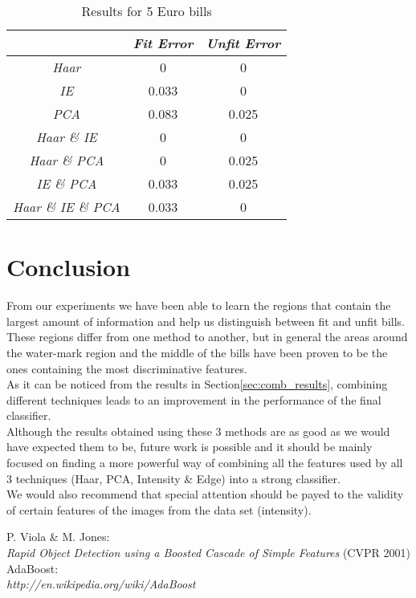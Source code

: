 \documentclass[11pt,twocolumn]{article}
\newcommand{\tit}{\textit}
\begin{document}
		\begin{table}[!htbp]
			\caption{Results for 5 Euro bills}
			\selectfont\small
			\label{table5}
			\centering 
			\begin{tabular}{ | c | c | c|}
				\hline\hline & \emph{Fit Error} & \emph{Unfit Error} \\ [0.5ex]\hline 
				\emph{Haar} & 0 & 0 \\ [0.5ex]\hline
				\emph{IE} & 0.033 & 0 \\ [0.5ex]\hline
				\emph{PCA} & 0.083 & 0.025 \\ [0.5ex]\hline
				\emph{Haar \& IE} & 0 & 0 \\ [0.5ex]\hline
				\emph{Haar \& PCA} & 0 & 0.025 \\ [0.5ex]\hline
				\emph{IE \& PCA} & 0.033 & 0.025 \\ [0.5ex]\hline
				\emph{Haar \& IE \& PCA} & 0.033 & 0 \\ [0.5ex]\hline
			\end{tabular}
			\label{table:nonlin} 
		\end{table}		  	
	\section{Conclusion}\label{sec:conclusion}
		\hspace*{10px}From our experiments we have been able to learn the regions that contain the largest amount of information and help us distinguish between fit and unfit bills. These regions differ from one method to another, but in general the areas around the water-mark region and the middle of the bills have been proven to be the ones containing the most discriminative features.\\
		\hspace*{10px}As it can be noticed from the results in Section\ref{sec:comb_results}, combining different techniques leads to an improvement in the performance of the final classifier.\\
		\hspace*{10px}Although the results obtained using these 3 methods are as good as we would have expected them to be, future work is possible and it should be mainly focused on finding a more powerful way of combining all the features used by all 3 techniques (Haar, PCA, Intensity \& Edge) into a strong classifier.\\
		\hspace*{10px}We would also recommend that special attention should be payed to the validity of certain features of the images from the data set (intensity).\\  
	\begin{thebibliography}{2} 
			P. Viola \& M. Jones:\\
			\tit{Rapid Object Detection using a Boosted Cascade of Simple Features}
			(CVPR 2001)
			AdaBoost: \\
			\tit{http://en.wikipedia.org/wiki/AdaBoost}	
	\end{thebibliography}
\end{document}
